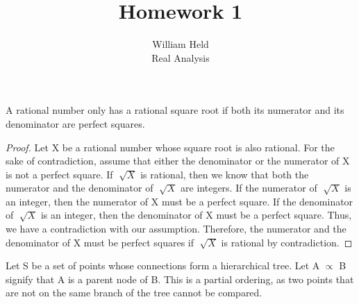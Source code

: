 \documentclass[12pt]{article}
\newenvironment{exercise}[2][Exercise]{\begin{trivlist}
\item[\hskip \labelsep {\bfseries #1}\hskip \labelsep {\bfseries #2.}]}{\end{trivlist}}
\newenvironment{proposition}[2][Proposition]{\begin{trivlist}
\item[\hskip \labelsep {\bfseries #1}\hskip \labelsep {\bfseries #2.}]}{\end{trivlist}}
\begin{document}
 
 
 
\title{Homework 1}%
\author{William Held\\%
Real Analysis} %
 
\maketitle
 
\begin{proposition}{1} %
A rational number only has a rational square root if both its numerator and its denominator are perfect squares.
\end{proposition}
 
\begin{proof}
Let X be a rational number whose square root is also rational. For the sake of contradiction, assume that either the denominator or the numerator of X is not a perfect square. If $\sqrt[]{X}$ is rational, then we know that both the numerator and the denominator of $\sqrt[]{X}$ are integers. If the numerator of $\sqrt[]{X}$ is an integer, then the numerator of X must be a perfect square. If the denominator of $\sqrt[]{X}$ is an integer, then the denominator of X must be a perfect square. Thus, we have a contradiction with our assumption. Therefore, the numerator and the denominator of X must be perfect squares if $\sqrt[]{X}$ is rational by contradiction.
\end{proof}
 
\begin{exercise}{2}
Let S be a set of points whose connections form a hierarchical tree. Let A $\propto$ B signify that A is a parent node of B. This is a partial ordering, as two points that are not on the same branch of the tree cannot be compared.
\end{exercise}
\end{document}
